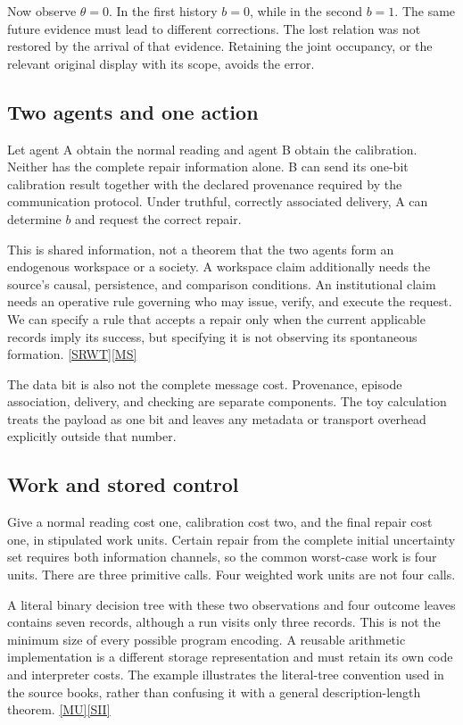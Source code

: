 \documentclass[11pt,oneside]{article}
\newcommand{\src}[1]{\hyperlink{cat:#1}{\textsf{[#1]}}}
\begin{document}
Now observe $\theta=0$. In the first history $b=0$, while in the second $b=1$. The same future evidence must lead to different corrections. The lost relation was not restored by the arrival of that evidence. Retaining the joint occupancy, or the relevant original display with its scope, avoids the error.

\subsection{Two agents and one action}
Let agent A obtain the normal reading and agent B obtain the calibration. Neither has the complete repair information alone. B can send its one-bit calibration result together with the declared provenance required by the communication protocol. Under truthful, correctly associated delivery, A can determine $b$ and request the correct repair.

This is shared information, not a theorem that the two agents form an endogenous workspace or a society. A workspace claim additionally needs the source's causal, persistence, and comparison conditions. An institutional claim needs an operative rule governing who may issue, verify, and execute the request. We can specify a rule that accepts a repair only when the current applicable records imply its success, but specifying it is not observing its spontaneous formation. \src{SRWT}\src{MS}

The data bit is also not the complete message cost. Provenance, episode association, delivery, and checking are separate components. The toy calculation treats the payload as one bit and leaves any metadata or transport overhead explicitly outside that number.

\subsection{Work and stored control}
Give a normal reading cost one, calibration cost two, and the final repair cost one, in stipulated work units. Certain repair from the complete initial uncertainty set requires both information channels, so the common worst-case work is four units. There are three primitive calls. Four weighted work units are not four calls.

A literal binary decision tree with these two observations and four outcome leaves contains seven records, although a run visits only three records. This is not the minimum size of every possible program encoding. A reusable arithmetic implementation is a different storage representation and must retain its own code and interpreter costs. The example illustrates the literal-tree convention used in the source books, rather than confusing it with a general description-length theorem. \src{MU}\src{SII}
\end{document}
